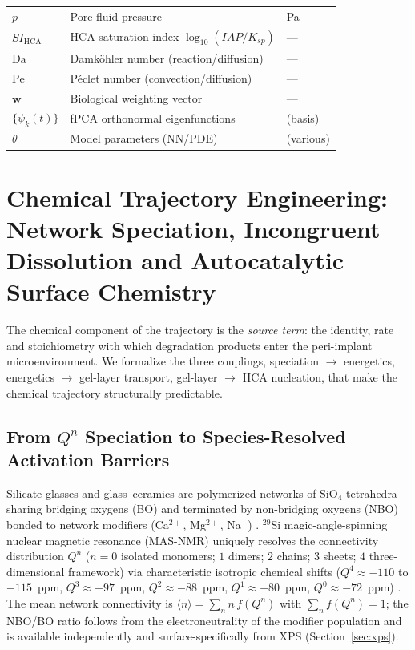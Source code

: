 \documentclass[11pt]{article}
\newcommand{\SIhc}{\mathit{SI}_{\mathrm{HCA}}}
\begin{document}
\begin{table}[htbp]
\begin{tabular}{L{2.4cm} L{6.6cm} L{3.4cm}}
$p$ & Pore-fluid pressure & Pa \\
$\SIhc$ & HCA saturation index $\log_{10}(IAP/K_{sp})$ & --- \\
$\mathrm{Da}$ & Damk\"ohler number (reaction/diffusion) & --- \\
$\mathrm{Pe}$ & P\'eclet number (convection/diffusion) & --- \\
$\mathbf{w}$ & Biological weighting vector & --- \\
$\{\psi_k(t)\}$ & fPCA orthonormal eigenfunctions & (basis) \\
$\theta$ & Model parameters (NN/PDE) & (various) \\
\bottomrule
\end{tabular}
\end{table}


\section{Chemical Trajectory Engineering: Network Speciation, Incongruent Dissolution and Autocatalytic Surface Chemistry}
\label{sec:chem}


The chemical component of the trajectory is the \emph{source term}: the identity, rate and stoichiometry with which degradation products enter the peri-implant microenvironment. We formalize the three couplings, speciation $\rightarrow$ energetics, energetics $\rightarrow$ gel-layer transport, gel-layer $\rightarrow$ HCA nucleation, that make the chemical trajectory structurally predictable.


\subsection{From $Q^n$ Speciation to Species-Resolved Activation Barriers}


Silicate glasses and glass--ceramics are polymerized networks of SiO$_4$ tetrahedra sharing bridging oxygens (BO) and terminated by non-bridging oxygens (NBO) bonded to network modifiers (Ca$^{2+}$, Mg$^{2+}$, Na$^{+}$) \cite{Greaves1981,Stebbins2017}. $^{29}$Si magic-angle-spinning nuclear magnetic resonance (MAS-NMR) uniquely resolves the connectivity distribution $Q^n$ ($n=0$ isolated monomers; $1$ dimers; $2$ chains; $3$ sheets; $4$ three-dimensional framework) via characteristic isotropic chemical shifts ($Q^4\approx-110$ to $-115$~ppm, $Q^3\approx-97$~ppm, $Q^2\approx-88$~ppm, $Q^1\approx-80$~ppm, $Q^0\approx-72$~ppm) \cite{Magi1984,Maekawa2011,Turner2020}. The mean network connectivity is $\langle n\rangle=\sum_n n\,f(Q^n)$ with $\sum_n f(Q^n)=1$; the NBO/BO ratio follows from the electroneutrality of the modifier population and is available independently and surface-specifically from XPS (Section~\ref{sec:xps}).
\end{document}
